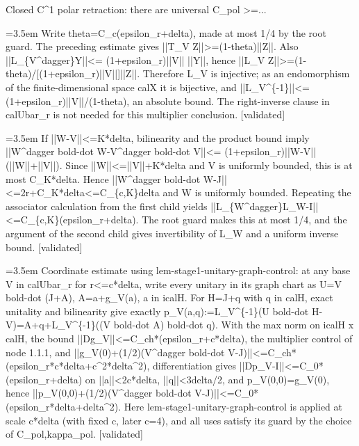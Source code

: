 \documentclass{article}
\newcommand{\step}[1]{\par\noindent\hangindent=3.5em\hangafter=1%
  \makebox[3.5em][l]{\textbf{#1.}}}
\newcommand{\steptag}[1]{\hfill{\small\textsf{[#1]}}}
\begin{document}
\begin{proofbox}{Closed C\textasciicircum{}1 polar retraction: there are universal C\_pol >=...}
\step{1.1.1.2} Write theta=C\_c(epsilon\_r+delta), made at most 1/4 by the root guard. The preceding estimate gives ||T\_V Z||>=(1-theta)||Z||. Also ||L\_\{V\textasciicircum{}dagger\}Y||<= (1+epsilon\_r)||V|| ||Y||, hence ||L\_V Z||>=(1-theta)/[(1+epsilon\_r)||V||]||Z||. Therefore L\_V is injective; as an endomorphism of the finite-dimensional space calX it is bijective, and ||L\_V\textasciicircum{}\{-1\}||<=(1+epsilon\_r)||V||/(1-theta), an absolute bound. The right-inverse clause in calUbar\_r is not needed for this multiplier conclusion. \steptag{validated} \\[4pt]
\step{1.1.1.3} If ||W-V||<=K*delta, bilinearity and the product bound imply ||W\textasciicircum{}dagger bold-dot W-V\textasciicircum{}dagger bold-dot V||<= (1+epsilon\_r)||W-V||(||W||+||V||). Since ||W||<=||V||+K*delta and V is uniformly bounded, this is at most C\_K*delta. Hence ||W\textasciicircum{}dagger bold-dot W-J||<=2r+C\_K*delta<=C\_\{c,K\}delta and W is uniformly bounded. Repeating the associator calculation from the first child yields ||L\_\{W\textasciicircum{}dagger\}L\_W-I||<=C\_\{c,K\}(epsilon\_r+delta). The root guard makes this at most 1/4, and the argument of the second child gives invertibility of L\_W and a uniform inverse bound. \steptag{validated} \\[4pt]
\step{1.1.2} Coordinate estimate using lem-stage1-unitary-graph-control: at any base V in calUbar\_r for r<=c*delta, write every unitary in its graph chart as U=V bold-dot (J+A), A=a+g\_V(a), a in icalH. For H=J+q with q in calH, exact unitality and bilinearity give exactly p\_V(a,q):=L\_V\textasciicircum{}\{-1\}(U bold-dot H-V)=A+q+L\_V\textasciicircum{}\{-1\}((V bold-dot A) bold-dot q). With the max norm on icalH x calH, the bound ||Dg\_V||<=C\_ch*(epsilon\_r+c*delta), the multiplier control of node 1.1.1, and ||g\_V(0)+(1/2)(V\textasciicircum{}dagger bold-dot V-J)||<=C\_ch*(epsilon\_r*c*delta+c\textasciicircum{}2*delta\textasciicircum{}2), differentiation gives ||Dp\_V-I||<=C\_0*(epsilon\_r+delta) on ||a||<2c*delta, ||q||<3delta/2, and p\_V(0,0)=g\_V(0), hence ||p\_V(0,0)+(1/2)(V\textasciicircum{}dagger bold-dot V-J)||<=C\_0*(epsilon\_r*delta+delta\textasciicircum{}2). Here lem-stage1-unitary-graph-control is applied at scale c*delta (with fixed c, later c=4), and all uses satisfy its guard by the choice of C\_pol,kappa\_pol. \steptag{validated} \\[6pt]

\end{proofbox}
\end{document}
